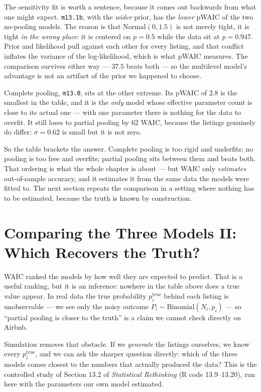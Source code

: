 \documentclass[11pt,a4paper]{article}
\begin{document}
The sensitivity fit is worth a sentence, because it comes out backwards from
what one might expect. \texttt{m13.1b}, with the \emph{wider} prior, has the
\emph{lower} pWAIC of the two no-pooling models. The reason is that
$\text{Normal}(0,1.5)$ is not merely tight, it is tight \emph{in the wrong
place}: it is centered on $p = 0.5$ while the data sit at $p = 0.947$. Prior
and likelihood pull against each other for every listing, and that conflict
inflates the variance of the log-likelihood, which is what pWAIC measures. The
comparison survives either way --- $37.5$ beats both --- so the multilevel
model's advantage is not an artifact of the prior we happened to choose.

Complete pooling, \texttt{m13.0}, sits at the other extreme. Its pWAIC of $2.8$
is the smallest in the table, and it is the \emph{only} model whose effective parameter count is close
to its actual one --- with one parameter there is nothing for the data to
overfit. It still loses to partial pooling by $62$ WAIC, because the listings
genuinely do differ: $\sigma = 0.62$ is small but it is not zero.

So the table brackets the answer. Complete pooling is too rigid and underfits;
no pooling is too free and overfits; partial pooling sits between them and beats
both. That ordering is what the whole chapter is about --- but WAIC only
\emph{estimates} out-of-sample accuracy, and it estimates it from the same data
the models were fitted to. The next section repeats the comparison in a setting
where nothing has to be estimated, because the truth is known by construction.

\section{Comparing the Three Models II: Which Recovers the Truth?}

WAIC ranked the models by how well they are expected to predict. That is a
useful ranking, but it is an inference: nowhere in the table above does a true
value appear. In real data the true probability $p_i^{\text{true}}$ behind each
listing is unobservable --- we see only the noisy outcome
$P_i \sim \text{Binomial}(N_i, p_i)$ --- so ``partial pooling is closer to the
truth'' is a claim we cannot check directly on Airbnb.

Simulation removes that obstacle. If we \emph{generate} the listings ourselves,
we know every $p_i^{\text{true}}$, and we can ask the sharper question directly:
which of the three models comes closest to the numbers that actually produced
the data? This is the controlled study of Section 13.2 of \emph{Statistical
Rethinking} (R code 13.9--13.20), run here with the parameters our own model
estimated.
\end{document}
